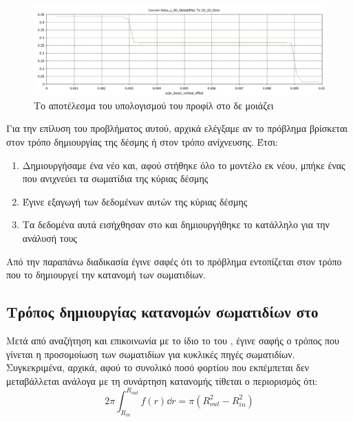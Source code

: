 \begin{figure}[tph]
\includegraphics[width=\textwidth]{figures/CST-profile-steps}
\centering
\caption{Το αποτέλεσμα του υπολογισμού του προφίλ στο  δε μοιάζει }
\label{fig:CST-profile-steps}
\end{figure}

Για την επίλυση του προβλήματος αυτού, αρχικά ελέγξαμε αν το πρόβλημα βρίσκεται στον τρόπο δημιουργίας της δέσμης ή στον τρόπο ανίχνευσης. 
Έτσι:
\begin{enumerate}
\item Δημιουργήσαμε ένα νέο  και, αφού στήθηκε όλο το μοντέλο εκ νέου, μπήκε ένας  που ανιχνεύει τα σωματίδια της κύριας δέσμης
\item Έγινε εξαγωγή των δεδομένων αυτών της κύριας δέσμης
\item Τα δεδομένα αυτά εισήχθησαν στο  και δημιουργήθηκε το κατάλληλο  για την ανάλυσή τους
\end{enumerate}

Από την παραπάνω διαδικασία έγινε σαφές ότι το πρόβλημα εντοπίζεται στον τρόπο που το  δημιουργεί την κατανομή των σωματιδίων.

\subsection{Τρόπος δημιουργίας  κατανομών σωματιδίων στο }

Μετά από αναζήτηση και επικοινωνία με το ίδιο το  του , έγινε σαφής ο τρόπος που γίνεται η προσομοίωση των σωματιδίων για  κυκλικές πηγές σωματιδίων.
Συγκεκριμένα, αρχικά, αφού το συνολικό ποσό φορτίου που εκπέμπεται δεν μεταβάλλεται ανάλογα με τη συνάρτηση κατανομής τίθεται ο περιορισμός ότι:
\begin{equation}\label{eq:CST-gaussian-restriction}
2\pi \int_{R_{in}}^{R_{out}} f(r) \dd r = \pi \left(R_{out}^2 - R_{in}^2 \right) 
\end{equation}

